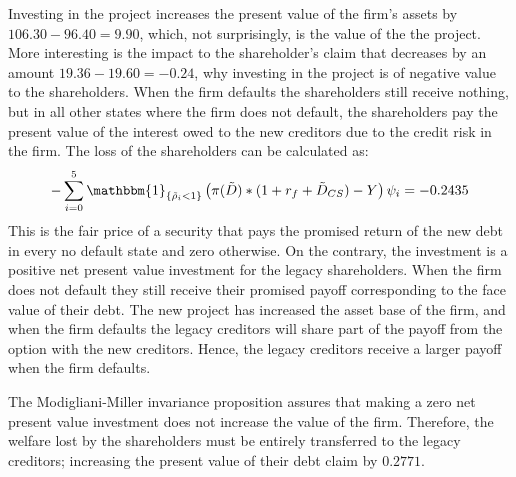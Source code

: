 \documentclass[../main.tex]{subfiles}
\begin{document}
        Investing in the project increases the present value of the firm's assets by $106.30 - 96.40 = 9.90$, which, not surprisingly, is the value of the the project. More interesting is the impact to the shareholder's claim that decreases by an amount $19.36 - 19.60 = -0.24$, why investing in the project is of negative value to the shareholders. When the firm defaults the shareholders still receive nothing, but in all other states where the firm does not default, the shareholders pay the present value of the interest owed to the new creditors due to the credit risk in the firm. The loss of the shareholders can be calculated as: 
            \begin{align}
                -\sum_{i=0}^{5} 
                    \mathbbm{1}_{\{\tilde{\rho}_{i} < 1\}}
                    \left(
                        \pi(\tilde{D})*(1+r_{f} + \tilde{D}_{CS})
                        - Y
                    \right)
                    \psi_{i} = -0.2435
            \end{align}
        This is the fair price of a security that pays the promised return of the new debt in every no default state and zero otherwise. 
        On the contrary, the investment is a positive net present value investment for the legacy shareholders. When the firm does not default they still receive their promised payoff corresponding to the face value of their debt. The new project has increased the asset base of the firm, and when the firm defaults the legacy creditors will share part of the payoff from the option with the new creditors. Hence, the legacy creditors receive a larger payoff when the firm defaults. 

        The Modigliani-Miller invariance proposition assures that making a zero net present value investment does not increase the value of the firm. Therefore, the welfare lost by the shareholders must be entirely transferred to the legacy creditors; increasing the present value of their debt claim by $0.2771$.
\end{document}
